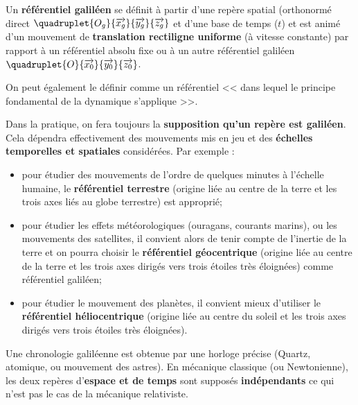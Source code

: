 \begin{defi}

Un \textbf{référentiel galiléen} se définit à partir d'une repère spatial 
(orthonormé direct $\quadruplet{O_g}{\overrightarrow{x_g}}{\overrightarrow{y_g}}{\overrightarrow{z_g}}$ et d'une base de temps ($t$) et est animé d'un mouvement de \textbf{translation rectiligne uniforme} (à vitesse constante) par rapport à un référentiel absolu fixe ou à un autre référentiel galiléen $\quadruplet{O}{\overrightarrow{x_0}}{\overrightarrow{y_0}}{\overrightarrow{z_0}}$. 

On peut également le définir comme un référentiel << dans lequel le principe fondamental de la dynamique s'applique >>.
\end{defi}

\begin{remarque}[s]
Dans la pratique, on fera toujours la \textbf{supposition qu'un repère est galiléen}. Cela dépendra effectivement des mouvements mis en jeu et des \textbf{échelles temporelles et spatiales} considérées. 
Par exemple :
\begin{itemize}
\item pour étudier des mouvements de l'ordre de quelques minutes à l'échelle humaine, le \textbf{référentiel terrestre} (origine liée au centre de la terre et les trois axes liés au globe terrestre) est approprié;
\item pour étudier les effets météorologiques (ouragans, courants marins), ou les mouvements des satellites, il convient alors de tenir compte de l'inertie de la terre et on pourra choisir le \textbf{référentiel géocentrique} (origine liée au centre de la terre et les trois axes dirigés vers trois étoiles très éloignées) comme référentiel galiléen;
\item pour étudier le mouvement des planètes, il convient mieux d'utiliser le \textbf{référentiel héliocentrique} (origine liée au centre du soleil et les trois axes dirigés vers trois étoiles très éloignées).
\end{itemize}

Une chronologie galiléenne est obtenue par une horloge précise (Quartz, atomique, ou mouvement des astres).
En mécanique classique (ou Newtonienne), les deux repères d'\textbf{espace et de temps} sont supposés \textbf{indépendants} ce qui n'est pas le cas de la mécanique relativiste. 
\end{remarque}



